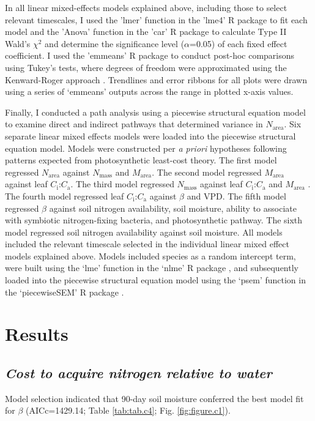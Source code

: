 In all linear mixed-effects models explained above, including those to select relevant timescales, I used the 'lmer' function in the 'lme4' R package  to fit each model and the 'Anova' function in the 'car' R package  to calculate Type II Wald's $\chi^2$ and determine the significance level ($\alpha$=0.05) of each fixed effect coefficient. I used the 'emmeans' R package  to conduct post-hoc comparisons using Tukey's tests, where degrees of freedom were approximated using the Kenward-Roger approach . Trendlines and error ribbons for all plots were drawn using a series of ‘emmeans’ outputs across the range in plotted x-axis values.

Finally, I conducted a path analysis using a piecewise structural equation model to examine direct and indirect pathways that determined variance in $N_\mathrm{area}$. Six separate linear mixed effects models were loaded into the piecewise structural equation model. Models were constructed per \textit{a priori} hypotheses following patterns expected from photosynthetic least-cost theory. The first model regressed $N_\mathrm{area}$ against $N_\mathrm{mass}$ and $M_\mathrm{area}$. The second model regressed $M_\mathrm{area}$ against leaf $C_\mathrm{i}$:$C_\mathrm{a}$. The third model regressed $N_\mathrm{mass}$ against leaf $C_\mathrm{i}$:$C_\mathrm{a}$ and $M_\mathrm{area}$ . The fourth model regressed leaf $C_\mathrm{i}$:$C_\mathrm{a}$ against $\beta$ and VPD. The fifth model regressed $\beta$ against soil nitrogen availability, soil moisture, ability to associate with symbiotic nitrogen-fixing bacteria, and photosynthetic pathway. The sixth model regressed soil nitrogen availability against soil moisture. All models included the relevant timescale selected in the individual linear mixed effect models explained above. Models included species as a random intercept term, were built using the ‘lme’ function in the ‘nlme’ R package , and subsequently loaded into the piecewise structural equation model using the ‘psem’ function in the ‘piecewiseSEM’ R package .
\clearpage

\newpage
\section{Results}
\subsection{\textit{Cost to acquire nitrogen relative to water}}
\noindent Model selection indicated that 90-day soil moisture conferred the best model fit for $\beta$ (AICc=1429.14; Table \ref{tab:tab.c4}; Fig. \ref{fig:figure.c1}).

